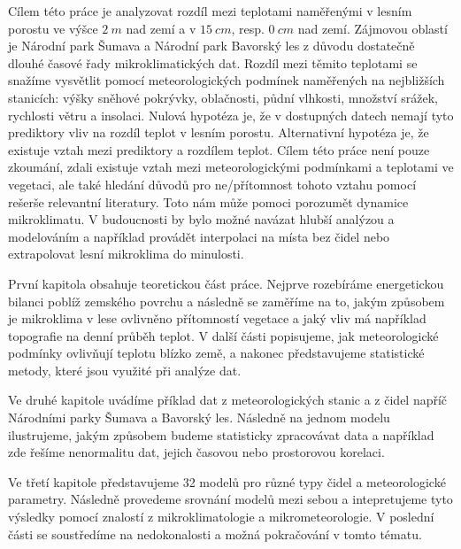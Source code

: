 Cílem této práce je analyzovat rozdíl mezi teplotami naměřenými v lesním porostu ve výšce $\SI{2}{m}$ nad zemí a v $\SI{15}{cm}$, resp. $\SI{0}{cm}$ nad zemí. Zájmovou oblastí je Národní park Šumava a Národní park Bavorský les z důvodu dostatečně dlouhé časové řady mikroklimatických dat. Rozdíl mezi těmito teplotami se snažíme vysvětlit pomocí meteorologických podmínek naměřených na nejbližších stanicích: výšky sněhové pokrývky, oblačnosti, půdní vlhkosti, množství srážek, rychlosti větru a insolaci. Nulová hypotéza je, že v dostupných datech nemají tyto prediktory vliv na rozdíl teplot v lesním porostu. Alternativní hypotéza je, že existuje vztah mezi prediktory a rozdílem teplot. Cílem této práce není pouze zkoumání, zdali existuje vztah mezi meteorologickými podmínkami a teplotami ve vegetaci, ale také hledání důvodů pro ne/přítomnost tohoto vztahu pomocí rešerše relevantní literatury. Toto nám může pomoci porozumět dynamice mikroklimatu. V budoucnosti by bylo možné navázat hlubší analýzou a modelováním a například provádět interpolaci na místa bez čidel nebo extrapolovat lesní mikroklima do minulosti.

První kapitola obsahuje teoretickou část práce. Nejprve rozebíráme energetickou bilanci poblíž zemského povrchu a následně se zaměříme na to, jakým způsobem je mikroklima v lese ovlivněno přítomností vegetace a jaký vliv má například topografie na denní průběh teplot. V další části popisujeme, jak meteorologické podmínky ovlivňují teplotu blízko země, a nakonec představujeme statistické metody, které jsou využité při analýze dat.

Ve druhé kapitole uvádíme příklad dat z meteorologických stanic a z čidel napříč Národními parky Šumava a Bavorský les. Následně na jednom modelu ilustrujeme, jakým způsobem budeme statisticky zpracovávat data a například zde řešíme nenormalitu dat, jejich časovou nebo prostorovou korelaci.

Ve třetí kapitole představujeme 32 modelů pro různé typy čidel a meteorologické parametry. Následně provedeme srovnání modelů mezi sebou a intepretujeme tyto výsledky pomocí znalostí z mikroklimatologie a mikrometeorologie. V poslední části se soustředíme na nedokonalosti a možná pokračování v tomto tématu.

